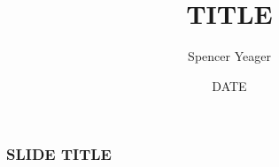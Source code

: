 \documentclass{beamer}
\title[The University of Arizona]{TITLE}
\author{Spencer Yeager}
\institute[]{SUBGROUP/GROUP}
\date{DATE}
\begin{document}
	\begin{frame}
		\titlepage
	\end{frame}

	\begin{frame}
		\frametitle{SLIDE TITLE}
	\end{frame}

\end{document}
